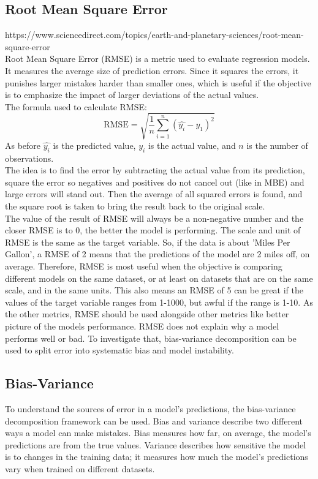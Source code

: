 \newpage

\subsection{Root Mean Square Error}
https://www.sciencedirect.com/topics/earth-and-planetary-sciences/root-mean-square-error    
\\
Root Mean Square Error (RMSE) is a metric used to evaluate regression models. It measures the average size of prediction errors. Since it squares the errors, it punishes larger mistakes harder than smaller ones, which is useful if the objective is to emphasize the impact of larger deviations of the actual values.
\\
The formula used to calculate RMSE:
$$\text{RMSE}=\sqrt{\frac{1}{n}\sum_{i=1}^{n}(\hat{y_i}-y_{1})^2}$$
As before $\hat{y_i}$ is the predicted value, $y_i$ is the actual value, and $n$ is the number of observations.
\\ The idea is to find the error by subtracting the actual value from its prediction, square the error so negatives and positives do not cancel out (like in MBE) and large errors will stand out. Then the average of all squared errors is found, and the square root is taken to bring the result back to the original scale. 
\\

The value of the result of RMSE will always be a non-negative number and the closer RMSE is to 0, the better the model is performing. The scale and unit of RMSE is the same as the target variable. So, if the data is about 'Miles Per Gallon', a RMSE of 2 means that the predictions of the model are 2 miles off, on average. Therefore, RMSE is most useful when the objective is comparing different models on the same dataset, or at least on datasets that are on the same scale, and in the same units. This also means an RMSE of 5 can be great if the values of the target variable ranges from 1-1000, but awful if the range is 1-10. As the other metrics, RMSE should be used alongside other metrics like better picture of the models performance. RMSE does not explain why a model performs well or bad. To investigate that, bias-variance decomposition can be used to split error into systematic bias and model instability.
\newpage

\subsection{Bias-Variance}
To understand the sources of error in a model’s predictions, the bias-variance decomposition framework can be used. Bias and variance describe two different ways a model can make mistakes. Bias measures how far, on average, the model's predictions are from the true values. Variance describes how sensitive the model is to changes in the training data; it measures how much the model’s predictions vary when trained on different datasets. 

